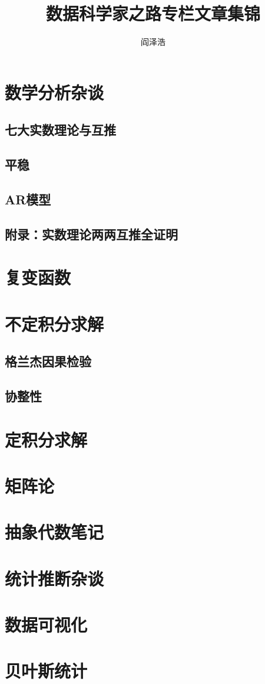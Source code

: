 \documentclass{article}%
\title{数据科学家之路专栏文章集锦}
\author{阎泽浩}
\begin{document}
	\maketitle
	\tableofcontents
	\newpage
	\section{数学分析杂谈}
	\subsection{七大实数理论与互推}

	\subsection{平稳}

	\subsection{AR模型}
	
    \subsection{附录：实数理论两两互推全证明}
    \section{复变函数}
    \section{不定积分求解}
    \subsection{格兰杰因果检验}
    
    \subsection{协整性}
    \section{定积分求解}
    \section{矩阵论}
    \section{抽象代数笔记}
    \section{统计推断杂谈}
    \section{数据可视化}
    \section{贝叶斯统计}
    
	
		
	
	
	
	
	
	
	
	
\end{document}
